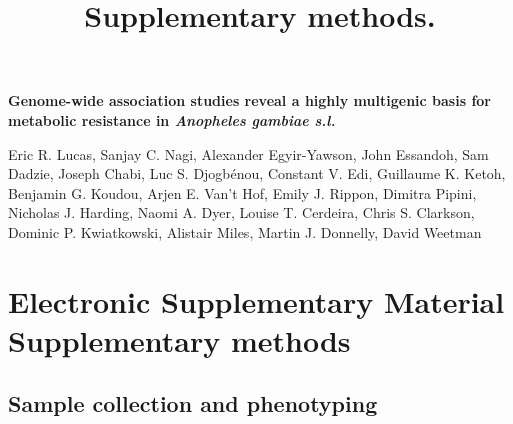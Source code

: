 \documentclass[a4paper,12pt]{article}
\title{Supplementary methods.}
\begin{document}
\onehalfspacing

\begin{center}
	\Large
	\noindent \textbf{Genome-wide association studies reveal a highly multigenic basis for metabolic resistance in \textit{Anopheles gambiae s.l.}}

	\normalsize

	\vskip 3cm

\end{center}

\noindent Eric R. Lucas, Sanjay C. Nagi, Alexander Egyir-Yawson, John Essandoh, Sam Dadzie, Joseph Chabi, Luc S. Djogbénou, Constant V. Edi, Guillaume K. Ketoh, Benjamin G. Koudou, Arjen E. Van’t Hof, Emily J. Rippon, Dimitra Pipini, Nicholas J. Harding, Naomi A. Dyer, Louise T. Cerdeira, Chris S. Clarkson, Dominic P. Kwiatkowski, Alistair Miles, Martin J. Donnelly, David Weetman 
 
\vskip 2cm 


\section*{Electronic Supplementary Material \\ Supplementary methods}

\clearpage

\subsection{Sample collection and phenotyping}
\end{document}
